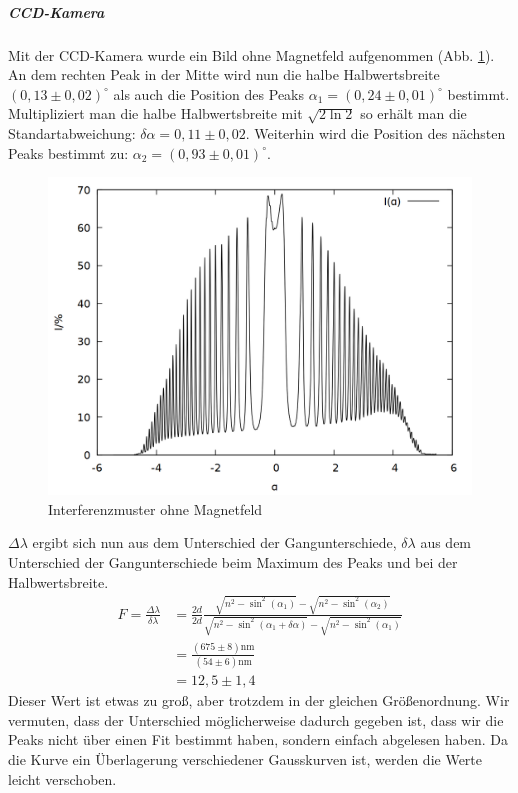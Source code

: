 \subparagraph{CCD-Kamera}
Mit der CCD-Kamera wurde ein Bild ohne Magnetfeld aufgenommen (Abb. \ref{fig:ohneb}).\\
An dem rechten Peak in der Mitte wird nun die halbe Halbwertsbreite $(0,13 \pm 0,02)^\circ$  als auch die Position des Peaks $\alpha_{1} = (0,24\pm 0,01)^\circ$ bestimmt. Multipliziert man die halbe Halbwertsbreite mit $\sqrt{2\ln 2}$ so erhält man die Standartabweichung: $\delta \alpha = 0,11 \pm 0,02$. Weiterhin wird die Position des nächsten Peaks bestimmt zu: $\alpha_2 = (0,93\pm 0,01)^\circ$.\\
\begin{figure}
\centering
\includegraphics[scale=0.25]{data/zeeman/out_0_0_raw.png}
\caption{Interferenzmuster ohne Magnetfeld}
\label{fig:ohneb}
\end{figure}

$\Delta \lambda$ ergibt sich nun aus dem Unterschied der Gangunterschiede, $\delta \lambda$ aus dem Unterschied der Gangunterschiede beim Maximum des Peaks und bei der Halbwertsbreite.
\begin{align*}
F = \frac{\Delta \lambda}{\delta \lambda} &= \frac{2d}{2d}\frac{\sqrt{n^2-\sin^2(\alpha_1)}-\sqrt{n^2-\sin^2(\alpha_2)}}{\sqrt{n^2-\sin^2(\alpha_1+\delta \alpha)}-\sqrt{n^2-\sin^2(\alpha_1)}}\\
	&= \frac{(675 \pm 8) \si{\nano\meter}}{(54 \pm 6) \si{\nano\meter}}\\
	&=12,5 \pm 1,4
\end{align*}
Dieser Wert ist etwas zu groß, aber trotzdem in der gleichen Größenordnung. Wir vermuten, dass der Unterschied möglicherweise dadurch gegeben ist, dass wir die Peaks nicht über einen Fit bestimmt haben, sondern einfach abgelesen haben. Da die Kurve ein Überlagerung verschiedener Gausskurven ist, werden die Werte leicht verschoben.

